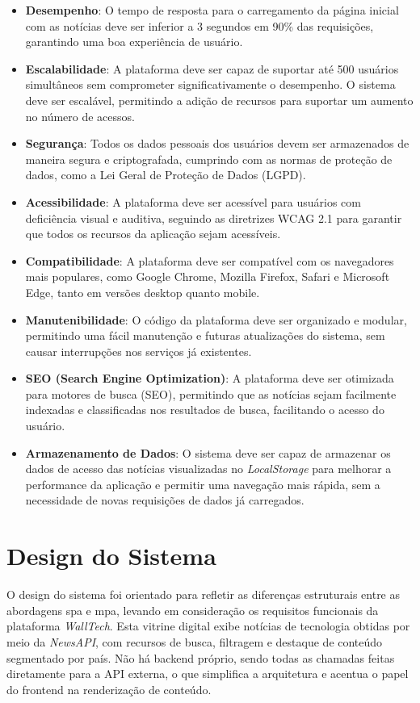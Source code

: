 \begin{itemize}
  \item \textbf{Desempenho}: O tempo de resposta para o carregamento da página inicial com as notícias deve ser inferior a 3 segundos em 90\% das requisições, garantindo uma boa experiência de usuário.
  \item \textbf{Escalabilidade}: A plataforma deve ser capaz de suportar até 500 usuários simultâneos sem comprometer significativamente o desempenho. O sistema deve ser escalável, permitindo a adição de recursos para suportar um aumento no número de acessos.
  \item \textbf{Segurança}: Todos os dados pessoais dos usuários devem ser armazenados de maneira segura e criptografada, cumprindo com as normas de proteção de dados, como a Lei Geral de Proteção de Dados (LGPD).
  \item \textbf{Acessibilidade}: A plataforma deve ser acessível para usuários com deficiência visual e auditiva, seguindo as diretrizes WCAG 2.1 para garantir que todos os recursos da aplicação sejam acessíveis.
  \item \textbf{Compatibilidade}: A plataforma deve ser compatível com os navegadores mais populares, como Google Chrome, Mozilla Firefox, Safari e Microsoft Edge, tanto em versões desktop quanto mobile.
  \item \textbf{Manutenibilidade}: O código da plataforma deve ser organizado e modular, permitindo uma fácil manutenção e futuras atualizações do sistema, sem causar interrupções nos serviços já existentes.
  \item \textbf{SEO (Search Engine Optimization)}: A plataforma deve ser otimizada para motores de busca (SEO), permitindo que as notícias sejam facilmente indexadas e classificadas nos resultados de busca, facilitando o acesso do usuário.
  \item \textbf{Armazenamento de Dados}: O sistema deve ser capaz de armazenar os dados de acesso das notícias visualizadas no \textit{LocalStorage} para melhorar a performance da aplicação e permitir uma navegação mais rápida, sem a necessidade de novas requisições de dados já carregados.
\end{itemize}

\section{Design do Sistema}
\label{cap:design}

O design do sistema foi orientado para refletir as diferenças estruturais entre as abordagens \acrshort{spa} e \acrshort{mpa}, levando em consideração os requisitos funcionais da plataforma \textit{WallTech}. Esta vitrine digital exibe notícias de tecnologia obtidas por meio da \textit{NewsAPI}, com recursos de busca, filtragem e destaque de conteúdo segmentado por país. Não há backend próprio, sendo todas as chamadas feitas diretamente para a API externa, o que simplifica a arquitetura e acentua o papel do frontend na renderização de conteúdo.

